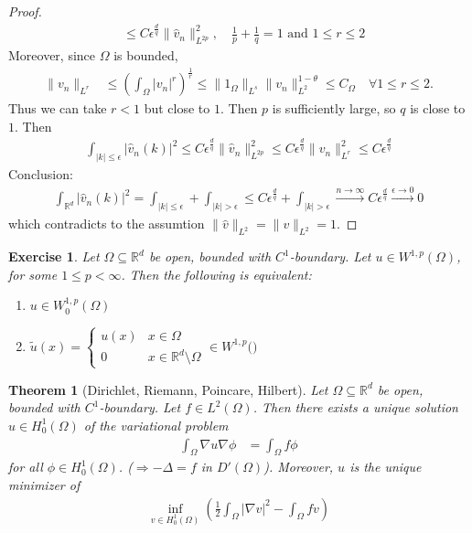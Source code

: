 \documentclass{report}
\theoremstyle{tommy}
\newtheorem{thm}[defn]{Theorem}
\newtheorem{ex}[defn]{Exercise}
\begin{document}
\begin{proof}
\begin{align*}
      & \le C \epsilon^{\frac{d}{q}}\|\hat v_n\|_{L^{2p}}^2, \quad \frac{1}{p} + \frac{1}{q} = 1 \text{ and } 1 \le r \le 2
    \end{align*}
    Moreover, since \(\Omega\) is bounded, 
    \begin{align*}
      \|v_n\|_{L^r} &\le \left(\int_\Omega |v_n|^r\right)^{\frac{1}{r}} \le \|1_\Omega\|_{L^s} \|v_n\|_{L^2}^{1 - \theta} \le C_\Omega \quad \forall 1 \le r \le 2.
    \end{align*}
    Thus we can take \(r < 1\) but close to \(1\). Then \(p\) is sufficiently large, so \(q\) is close to \(1\). Then 
    \begin{align*}
      \int_{|k| \le \epsilon} |\hat v_n(k)|^2 \le C \epsilon^{\frac{d}{q}} \|\hat v_n\|_{L^{2p}}^2 \le C \epsilon^{\frac{d}{q}} \|v_n\|_{L^r}^2 \le C \epsilon^{\frac{d}{q}}
    \end{align*}
    Conclusion:
    \begin{align*}
      \int_{\mathbb{R}^d} |\hat v_n(k)|^2 
      = \int_{|k| \le \epsilon} + \int_{|k| > \epsilon} \le C \epsilon^{\frac{d}{q}} + \int_{|k| > \epsilon} \xrightarrow{n \to \infty} C \epsilon^{\frac{d}{q}} \xrightarrow{\epsilon \to 0} 0
    \end{align*}
    which contradicts to the assumtion \(\|\hat v\|_{L^2} = \|v\|_{L^2} = 1\).
  \end{proof}

  \begin{ex}
    Let \(\Omega \subseteq \mathbb{R}^d\) be open, bounded with \(C^1\)-boundary. Let \(u \in W^{1,p}(\Omega)\), for some \(1 \le p < \infty\). Then the following is equivalent:
    \begin{enumerate}[label=\alph*)]
      \item \(u \in W^{1,p}_0(\Omega)\)
      \item \(\tilde u(x) = \begin{cases}
        u(x) & x \in \Omega \\ 0 & x \in \mathbb{R}^d \setminus \Omega
      \end{cases} \in W^{1,p}(\mathbb)\)
    \end{enumerate}
  \end{ex}

  \begin{thm}[Dirichlet, Riemann, Poincare, Hilbert]\label{Dirichlet, Riemann, Poincare, Hilbert}
    Let \(\Omega \subseteq \mathbb{R}^d\) be open, bounded with \(C^1\)-boundary. Let \(f \in L^2(\Omega)\). Then there exists a unique solution \(u \in H_0^1(\Omega)\) of the variational problem 
    \begin{align*}
      \int_\Omega \nabla u \nabla \phi &= \int_\Omega f \phi
    \end{align*}
    for all \(\phi \in H_0^1(\Omega)\). (\(\Rightarrow - \Delta = f\) in \(D'(\Omega)\)). Moreover, \(u\) is the unique minimizer of 
    \begin{align*}
      \inf_{v \in H_0^1(\Omega)} \left(\frac{1}{2} \int_\Omega |\nabla v|^2 - \int_\Omega f v\right)
    \end{align*}
  \end{thm}
\end{document}
